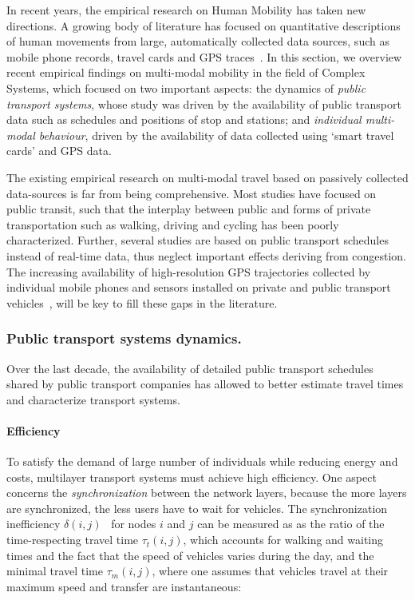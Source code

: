In recent years, the empirical research on Human Mobility has taken new directions. A growing body of literature has focused on quantitative descriptions of human movements from large, automatically collected data sources, such as mobile phone records, travel cards and GPS traces~\cite{barbosa2018human}. In this section, we overview recent empirical findings on multi-modal mobility in the field of Complex Systems, which focused on two important aspects: the dynamics of \emph{public transport systems}, whose study was driven by the availability of public transport data such as schedules and positions of stop and stations; and \emph{individual multi-modal behaviour}, driven by the availability of data collected using `smart travel cards' and GPS data. 

The existing empirical research on multi-modal travel based on passively collected data-sources is far from being comprehensive. Most studies have focused on public transit, such that the interplay between public and forms of private transportation such as walking, driving and cycling has been poorly characterized. Further, several studies are based on public transport schedules instead of real-time data, thus neglect important effects deriving from congestion. The increasing availability of high-resolution GPS trajectories collected by individual mobile phones and sensors installed on private and public transport vehicles~\cite{barbosa2018human}, will be key to fill these gaps in the literature.

\subsubsection{Public transport systems dynamics.} 
Over the last decade, the availability of detailed public transport schedules shared by public transport companies has allowed to better estimate travel times and characterize transport systems. 

\paragraph{Efficiency} 
To satisfy the demand of large number of individuals while reducing energy and costs, multilayer transport systems must achieve high efficiency. One aspect concerns the \emph{synchronization} between the network layers, because the more layers are synchronized, the less users have to wait for vehicles. The synchronization inefficiency $\delta(i,j)$~\cite{Gallotti2014Efficiency,barthelemy2016structure} for nodes $i$ and $j$ can be measured as as the ratio of the time-respecting travel time $\tau_t(i,j)$, which accounts for walking and waiting times and the fact that the speed of vehicles varies during the day, and the minimal travel time $\tau_m(i,j)$, where one assumes that vehicles travel at their maximum speed and transfer are instantaneous:

